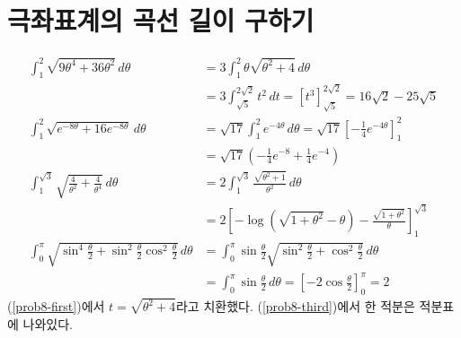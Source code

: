 \documentclass{scrartcl}
\begin{document}
\section{극좌표계의 곡선 길이 구하기}
\begin{align}
\int^2_1 \sqrt{9\theta^4+36\theta^2}\,d\theta&=3\int^2_1 \theta\sqrt{\theta^2+4}\,d\theta \nonumber \\
\label{prob8-first}&=3\int^{2\sqrt{2}}_{\sqrt{5}} t^2\,dt=\left[t^3\right]^{2\sqrt{2}}_{\sqrt{5}}=16\sqrt{2}-25\sqrt{5} \\
\int^2_1 \sqrt{e^{-8\theta}+16e^{-8\theta}}\,d\theta&=\sqrt{17}\int^2_1 e^{-4\theta}\,d\theta=\sqrt{17}\left[-\frac{1}{4}e^{-4\theta}\right]^2_1 \nonumber \\
&=\sqrt{17}\left( -\frac{1}{4}e^{-8}+\frac{1}{4}e^{-4} \right) \nonumber \\
\int^{\sqrt{3}}_1 \sqrt{\frac{4}{\theta^2}+\frac{4}{\theta^4}}\,d\theta&=2\int^{\sqrt{3}}_1\frac{\sqrt{\theta^2+1}}{\theta^2}\,d\theta \nonumber \\
\label{prob8-third}&=2\left[-\log\left( \sqrt{1+\theta^2}-\theta \right)-\frac{\sqrt{1+\theta^2}}{\theta}\right]^{\sqrt{3}}_1 \\
\int^\pi_0 \sqrt{\sin^4\frac{\theta}{2}+\sin^2\frac{\theta}{2}\cos^2\frac{\theta}{2}}\,d\theta&=\int^\pi_0 \sin\frac{\theta}{2}\sqrt{\sin^2\frac{\theta}{2}+\cos^2\frac{\theta}{2}}\,d\theta \nonumber \\
&=\int^\pi_0 \sin\frac{\theta}{2}\,d\theta=\left[-2\cos\frac{\theta}{2}\right]^\pi_0=2 \nonumber
\end{align}
(\ref{prob8-first})에서 \(t=\sqrt{\theta^2+4}\)라고 치환했다. (\ref{prob8-third})에서 한 적분은 적분표에 나와있다.
\end{document}
